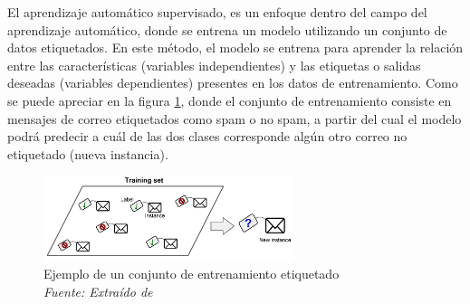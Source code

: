 El aprendizaje automático supervisado, es un enfoque dentro del campo del aprendizaje automático, donde se entrena un modelo utilizando un conjunto de datos etiquetados. En este método, el modelo se entrena para aprender la relación entre las características (variables independientes) y las etiquetas o salidas deseadas (variables dependientes) presentes en los datos de entrenamiento. Como se puede apreciar en la figura \ref{fig:an8}, donde el conjunto de entrenamiento consiste en mensajes de correo etiquetados como spam o no spam, a partir del cual el modelo podrá predecir a cuál de las dos clases corresponde algún otro correo no etiquetado (nueva instancia). 

\begin{figure}[h!]
	\includegraphics[width=0.65\textwidth]{capitulo2/figuras/an8.png}
	\caption{Ejemplo de un conjunto de entrenamiento etiquetado
		\\\textit{Fuente: Extraído de} \protect\cite[p. 8]{geron2019hands} }
	\label{fig:an8}
\end{figure}